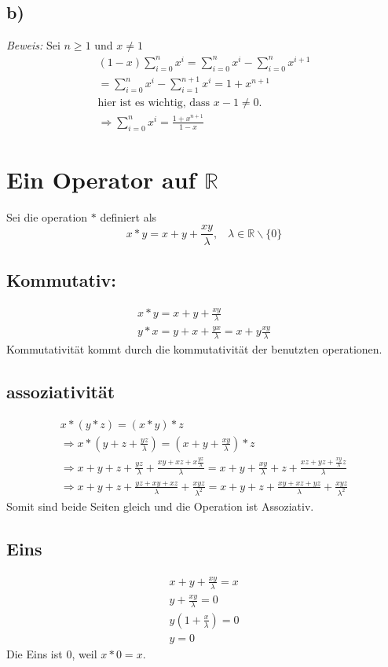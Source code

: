 \documentclass[]{scrartcl}
\begin{document}
\subsection{b)}

\textit{Beweis: }Sei $n\geq 1$ und $x\neq 1$
\begin{gather}
	(1-x)\sum_{i=0}^n x^i = \sum_{i=0}^n x^i - \sum_{i=0}^n x^{i+1}\\
	= \sum_{i=0}^n x^i - \sum_{i=1}^{n+1} x^i = 1 + x^{n+1}\\
	\text{hier ist es wichtig, dass $x-1 \neq 0$.} \nonumber\\
	\Rightarrow \sum_{i=0}^n x^i = \frac{1+x^{n+1}}{1-x}
\end{gather}

\section{Ein Operator auf $\mathbb{R}$}

Sei die operation $*$ definiert als
$$
x*y = x + y + \frac{xy}{\lambda},\;\;\; \lambda\in\mathbb R \backslash \{0\}
$$
\subsection{Kommutativ:}
\begin{gather}
	x*y = x + y + \frac{xy}{\lambda}\\
	y*x = y + x + \frac{yx}{\lambda} = x + y \frac{xy}{\lambda}
\end{gather}
Kommutativität kommt durch die kommutativität der benutzten operationen.
\subsection{assoziativität}
\begin{gather}
	x*(y*z) = (x*y)*z\\
	\Rightarrow x*(y + z + \frac{yz}{\lambda}) = (x+y+\frac{xy}{\lambda}) * z\\
	\Rightarrow x + y + z + \frac{yz}{\lambda} + \frac{xy + xz + x\frac{yz}{\lambda}}{\lambda}
	= x + y + \frac{xy}{\lambda} + z + \frac{xz + yz + \frac{xy}{\lambda}z}{\lambda}\\
	\Rightarrow x+y+z+ \frac{yz + xy + xz}{\lambda}+\frac{xyz}{\lambda^2} = x+y+z+ \frac{xy + xz + yz}{\lambda} + \frac{xyz}{\lambda^2}
\end{gather}
Somit sind beide Seiten gleich und die Operation ist Assoziativ.
\subsection{Eins}
\begin{gather}
	x + y + \frac{xy}{\lambda} = x\\
	y + \frac{xy}{\lambda} = 0\\
	y(1 + \frac{x}{\lambda}) = 0\\
	y = 0
\end{gather}
Die Eins ist $0$, weil $x*0 = x$.
\end{document}

